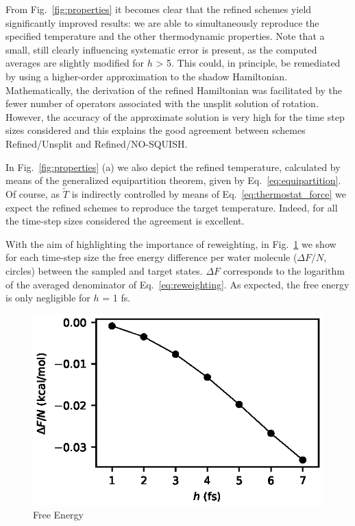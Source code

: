 \documentclass[
journal=jctcce,
layout=twocolumn
]{achemso}
\newcommand{\timestep}{h}
\newcommand{\refined}[1]{\widetilde{#1}}
\begin{document}
From Fig.~\ref{fig:properties} it becomes clear that the refined schemes yield significantly improved results: we are able to simultaneously reproduce the specified temperature and the other thermodynamic properties.
Note that a small, still clearly influencing systematic error is present, as the computed averages are slightly modified for $\timestep$ > 5.
This could, in principle, be remediated by using a higher-order approximation to the shadow Hamiltonian.
Mathematically, the derivation of the refined Hamiltonian was facilitated by the fewer number of operators associated with the unsplit solution of rotation.
However, the accuracy of the approximate solution is very high for the time step sizes considered\cite{Silveira_2017} and this explains the good agreement between schemes Refined/Unsplit and Refined/NO-SQUISH.

In Fig.~\ref{fig:properties} (a) we also depict the refined temperature, calculated by means of the generalized equipartition theorem, given by Eq.~\eqref{eq:equipartition}.
Of course, as $\refined{T}$ is indirectly controlled by means of Eq.~\eqref{eq:thermostat_force} we expect the refined schemes to reproduce the target temperature.
Indeed, for all the time-step sizes considered the agreement is excellent.

With the aim of highlighting the importance of reweighting, in Fig.~\ref{fig:free_energy} we show for each time-step size the free energy difference per water molecule ($\Delta F/N$, circles) between the sampled and target states.
$\Delta F$ corresponds to the logarithm of the averaged denominator of Eq.~\eqref{eq:reweighting}.
As expected, the free energy is only negligible for $h$ = 1 fs.

\begin{figure}
	\includegraphics{Figures/Free_Energy.eps}
	\caption{Free Energy}
	\label{fig:free_energy}
\end{figure}
\end{document}
